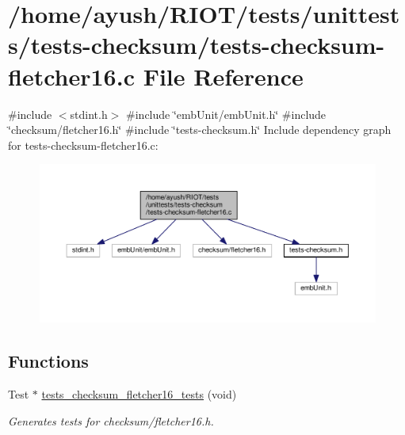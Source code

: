 \hypertarget{tests-checksum-fletcher16_8c}{}\section{/home/ayush/\+R\+I\+O\+T/tests/unittests/tests-\/checksum/tests-\/checksum-\/fletcher16.c File Reference}
\label{tests-checksum-fletcher16_8c}
{\ttfamily \#include $<$stdint.\+h$>$}\newline
{\ttfamily \#include \char`\"{}emb\+Unit/emb\+Unit.\+h\char`\"{}}\newline
{\ttfamily \#include \char`\"{}checksum/fletcher16.\+h\char`\"{}}\newline
{\ttfamily \#include \char`\"{}tests-\/checksum.\+h\char`\"{}}\newline
Include dependency graph for tests-\/checksum-\/fletcher16.c\+:
\nopagebreak
\begin{figure}[H]
\begin{center}
\leavevmode
\includegraphics[width=350pt]{tests-checksum-fletcher16_8c__incl}
\end{center}
\end{figure}
\subsection*{Functions}
\begin{DoxyCompactItemize}
\item 
Test $\ast$ \hyperlink{group__unittests_gae4f6cce052a84dde051799a5a57d9e44}{tests\+\_\+checksum\+\_\+fletcher16\+\_\+tests} (void)
\begin{DoxyCompactList}\small\item\em Generates tests for checksum/fletcher16.\+h. \end{DoxyCompactList}\end{DoxyCompactItemize}
